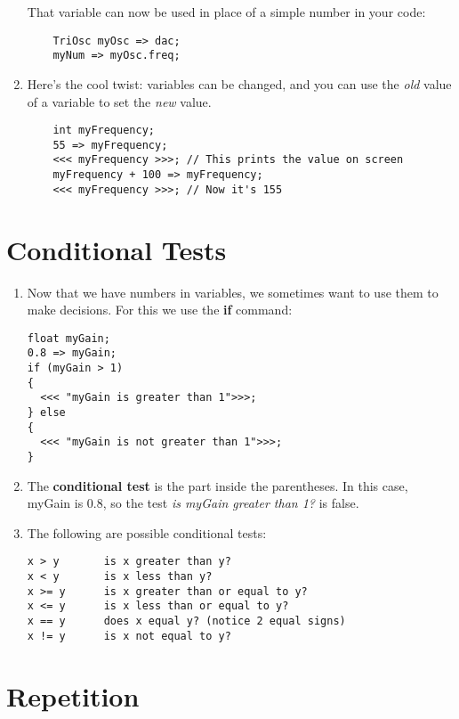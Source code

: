 \documentclass{article}
\begin{document}
\begin{enumerate}
That variable can now be used in place of a simple number in your code:

\begin{lstlisting}
	TriOsc myOsc => dac;
	myNum => myOsc.freq;
\end{lstlisting}

\item Here's the cool twist: variables can be changed, and you can use the
\textsl{old} value of a variable to set the \textsl{new} value.

\begin{lstlisting}
	int myFrequency;
	55 => myFrequency;
	<<< myFrequency >>>; // This prints the value on screen
	myFrequency + 100 => myFrequency;
	<<< myFrequency >>>; // Now it's 155
\end{lstlisting}

\end {enumerate}

\section {Conditional Tests}
\begin {enumerate}

\item Now that we have numbers in variables, we sometimes want to use them
to make decisions. For this we use the \textbf{if} command:

\begin{lstlisting}
float myGain;
0.8 => myGain;
if (myGain > 1)
{
  <<< "myGain is greater than 1">>>;
} else
{
  <<< "myGain is not greater than 1">>>;
}
\end{lstlisting}

\item The \textbf{conditional test} is the part inside the parentheses. In this case, myGain is 0.8, so the test \textsl {is myGain greater than 1?} is 
false.

\item The following are possible conditional tests:

\begin{lstlisting}
x > y		is x greater than y?
x < y		is x less than y?
x >= y		is x greater than or equal to y?
x <= y		is x less than or equal to y?
x == y		does x equal y? (notice 2 equal signs)
x != y		is x not equal to y?
\end{lstlisting}

\end {enumerate}

\section {Repetition}
\end{document}
